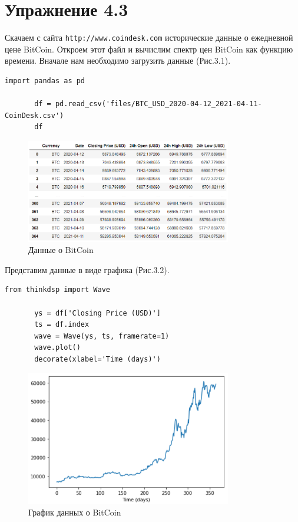 \documentclass[a4paper,12pt]{report}
\begin{document}
\chapter{Упражнение 4.3}
    Скачаем с сайта \texttt{http://www.coindesk.com} исторические данные о ежедневной цене BitCoin. Откроем этот файл и вычислим спектр цен BitCoin как функцию времени.
    Вначале нам необходимо загрузить данные (Рис.3.1). 
\begin{lstlisting}[caption=Получение данных о BitCoin]
       import pandas as pd

       df = pd.read_csv('files/BTC_USD_2020-04-12_2021-04-11-CoinDesk.csv')
       df
\end{lstlisting}
\begin{figure}[H]
        \centering
        \includegraphics[width=0.8\textwidth]{fig3-1.PNG}
        \caption{Данные о BitCoin}
        \label{fig:fig3-1}
\end{figure}
    
    Представим данные в виде графика (Рис.3.2).                                
\begin{lstlisting}[caption=Представление данных в виде графика]
       from thinkdsp import Wave
       
       ys = df['Closing Price (USD)']
       ts = df.index
       wave = Wave(ys, ts, framerate=1)
       wave.plot()
       decorate(xlabel='Time (days)')
\end{lstlisting}
\begin{figure}[H]
        \centering
        \includegraphics[width=0.8\textwidth]{fig3-2.PNG}
        \caption{График данных о BitCoin}
        \label{fig:fig3-2}
\end{figure}
\end{document}
